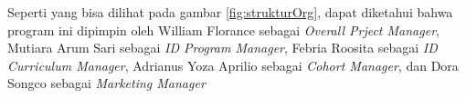 Seperti yang bisa dilihat pada gambar \ref{fig:strukturOrg}, dapat diketahui bahwa program ini dipimpin oleh William Florance sebagai \textit{Overall Prject Manager}, Mutiara Arum Sari sebagai \textit{ID Program Manager}, Febria Roosita sebagai \textit{ID Curriculum Manager}, Adrianus Yoza Aprilio sebagai \textit{Cohort Manager}, dan Dora Songco sebagai \textit{Marketing Manager}